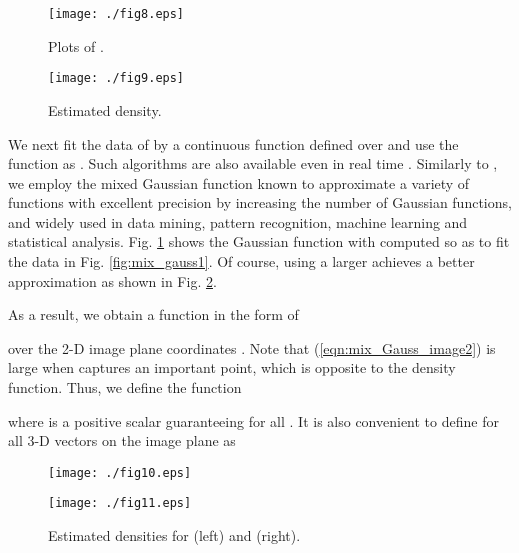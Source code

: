 \documentclass[conference,letterpaper]{ieeeconf}
\begin{document}
\begin{figure}
\begin{center}
\begin{minipage}{4.2cm}
{\texttt{[image: ./fig8.eps]}}
\caption{Plots of .}
\label{fig:mix_gauss1}
\end{minipage}
\begin{minipage}{4.2cm}
{\texttt{[image: ./fig9.eps]}}
\caption{Estimated density.}
\label{fig:mix_gauss2}
\end{minipage}
\end{center}
\end{figure}







We next fit the data of  by a continuous function
defined over  and use the function as .
Such algorithms are also available
even in real time \cite{MATLAB2}.
Similarly to \cite{IJRR}, we employ the mixed Gaussian function
known to approximate a variety of functions with excellent precision
by increasing the number of Gaussian functions,
and widely used in data mining, pattern recognition,
machine learning and statistical analysis.
Fig. \ref{fig:mix_gauss2} shows the Gaussian function with  computed so as to fit the data
in Fig. \ref{fig:mix_gauss1}.
Of course, using a larger  achieves a better approximation
as shown in Fig. \ref{fig:mix_gauss_various}.



As a result, we obtain a function in the form of
 
over the 2-D image plane coordinates .
Note that (\ref{eqn:mix_Gauss_image2}) is large when
 captures an important point, which is opposite to 
the density function.
Thus, we define the function
 
where  is a positive scalar guaranteeing 
for all .
It is also convenient to
define  for all
3-D vectors  on the image plane as
 







\begin{figure}
\begin{center}
\begin{minipage}{4cm}
{\texttt{[image: ./fig10.eps]}}
\end{minipage}
\hspace{0.2cm}
\begin{minipage}{4cm}
{\texttt{[image: ./fig11.eps]}}
\end{minipage}
\caption{Estimated densities for (left) and (right).}
\label{fig:mix_gauss_various}
\end{center}
\end{figure}
\end{document}
